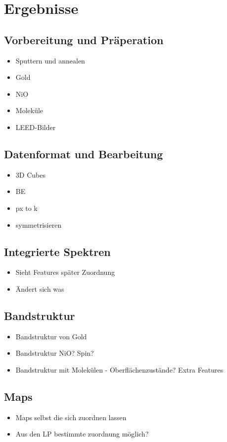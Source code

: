\chapter{Ergebnisse}
\section{Vorbereitung und Präperation}
    \begin{itemize}
        \item Sputtern und annealen
        \item Gold
        \item NiO
        \item Moleküle
        \item LEED-Bilder
    \end{itemize}

\section{Datenformat und Bearbeitung}
    \begin{itemize}
        \item 3D Cubes
        \item BE 
        \item px to k
        \item symmetrisieren
    \end{itemize}

\section{Integrierte Spektren}
    \begin{itemize}
        \item Sieht Features später Zuordnung
        \item Ändert sich was
    \end{itemize}

\section{Bandstruktur}
    \begin{itemize}
        \item Bandstruktur von Gold
        \item Bandstruktur NiO? Spin?
        \item Bandstruktur mit Molekülen - Oberflächenzustände? Extra Features
    \end{itemize}

\section{Maps}
    \begin{itemize}
        \item Maps selbst die sich zuordnen lassen
        \item Aus den LP bestimmte zuordnung möglich?
    \end{itemize}